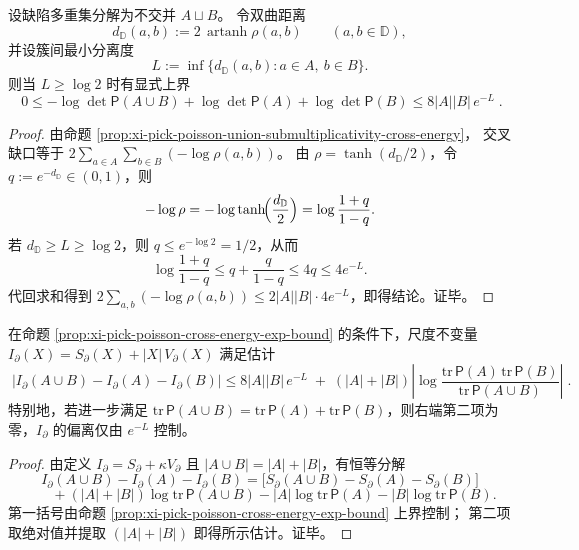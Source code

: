 \begin{proposition}[簇分离下交叉互能的显式指数上界]\label{prop:xi-pick-poisson-cross-energy-exp-bound}
设缺陷多重集分解为不交并 \(A\sqcup B\)。
令双曲距离
\[
d_{\mathbb{D}}(a,b):=2\,\operatorname{artanh}\rho(a,b)\qquad(a,b\in\mathbb D),
\]
并设簇间最小分离度
\[
L:=\inf\{d_{\mathbb D}(a,b):a\in A,\ b\in B\}.
\]
则当 \(L\ge \log 2\) 时有显式上界
\[
\boxed{\;
0\le -\log\det\mathsf P(A\cup B)+\log\det\mathsf P(A)+\log\det\mathsf P(B)
\le 8|A||B|\,e^{-L}\; } .
\]
\end{proposition}
\begin{proof}
由命题 \ref{prop:xi-pick-poisson-union-submultiplicativity-cross-energy}，
交叉缺口等于
\(
2\sum_{a\in A}\sum_{b\in B}(-\log\rho(a,b))
\)。
由 \(\rho=\tanh(d_{\mathbb D}/2)\)，令 \(q:=e^{-d_{\mathbb D}}\in(0,1)\)，则
\[
-\log\rho=-\log\tanh\!\Bigl(\frac{d_{\mathbb D}}{2}\Bigr)=\log\frac{1+q}{1-q}.
\]
若 \(d_{\mathbb D}\ge L\ge\log 2\)，则 \(q\le e^{-\log2}=1/2\)，从而
\[
\log\frac{1+q}{1-q}\le q+\frac{q}{1-q}\le 4q\le 4e^{-L}.
\]
代回求和得到
\(
2\sum_{a,b}(-\log\rho(a,b))\le 2|A||B|\cdot 4e^{-L}
\)，即得结论。证毕。
\end{proof}

\begin{corollary}[簇分离下尺度不变量的近可加性]\label{cor:xi-pick-poisson-scale-invariant-near-additivity}
在命题 \ref{prop:xi-pick-poisson-cross-energy-exp-bound} 的条件下，尺度不变量
\(
I_{\partial}(X)=S_{\partial}(X)+|X|\,V_{\partial}(X)
\)
满足估计
\[
\boxed{\;
\bigl|I_{\partial}(A\cup B)-I_{\partial}(A)-I_{\partial}(B)\bigr|
\le 8|A||B|\,e^{-L}
\;+\;(|A|+|B|)\left|\log\frac{\mathrm{tr}\,\mathsf P(A)\,\mathrm{tr}\,\mathsf P(B)}{\mathrm{tr}\,\mathsf P(A\cup B)}\right|\; } .
\]
特别地，若进一步满足 \(\mathrm{tr}\,\mathsf P(A\cup B)=\mathrm{tr}\,\mathsf P(A)+\mathrm{tr}\,\mathsf P(B)\)，则右端第二项为零，\(I_{\partial}\) 的偏离仅由 \(e^{-L}\) 控制。
\end{corollary}
\begin{proof}
由定义
\(
I_{\partial}=S_{\partial}+\kappa V_{\partial}
\)
且 \(|A\cup B|=|A|+|B|\)，有恒等分解
\[
I_{\partial}(A\cup B)-I_{\partial}(A)-I_{\partial}(B)
=\bigl[S_{\partial}(A\cup B)-S_{\partial}(A)-S_{\partial}(B)\bigr]
\]
\[
\qquad
+(|A|+|B|)\log\mathrm{tr}\,\mathsf P(A\cup B)-|A|\log\mathrm{tr}\,\mathsf P(A)-|B|\log\mathrm{tr}\,\mathsf P(B).
\]
第一括号由命题 \ref{prop:xi-pick-poisson-cross-energy-exp-bound} 上界控制；
第二项取绝对值并提取 \((|A|+|B|)\) 即得所示估计。证毕。
\end{proof}

\endinput
